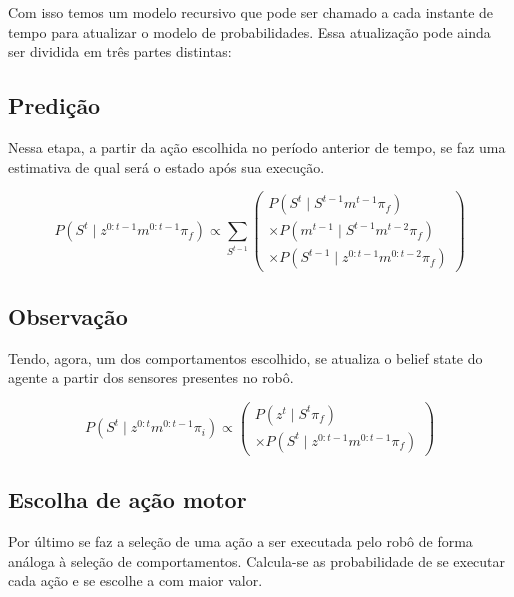 Com isso temos um modelo recursivo que pode ser chamado a cada instante de tempo para atualizar o modelo de probabilidades. Essa atualização pode ainda ser dividida em três partes distintas:

\subsection{Predição}

Nessa etapa, a partir da ação escolhida no período anterior de tempo, se faz uma estimativa de qual será o estado após sua execução.

\begin{equation}
    P \left( S^t \mid z^{0: t-1} m^{0: t-1} \pi_f \right) \propto \sum\limits_{S^{t-1}}
        \left(
            \begin{array}{l}
                P \left( S^t \mid S^{t-1} m^{t-1} \pi_f \right) \\
                \times P \left( m^{t-1} \mid S^{t-1} m^{t-2} \pi_f \right)\\
                \times P \left( S^{t-1} \mid z^{0: t-1} m^{0: t-2} \pi_f \right)
            \end{array}
        \right)
\end{equation}


\subsection{Observação}

Tendo, agora, um dos comportamentos escolhido, se atualiza o belief state do agente a partir dos sensores presentes no robô.

\begin{equation}
    P \left( S^t \mid z^{0: t} m^{0: t-1} \pi_i \right) \propto 
        \left(
            \begin{array}{l}
                P \left( z^t \mid S^t \pi_f \right) \\
                \times P \left( S^t \mid z^{0: t-1} m^{0: t-1} \pi_f \right)
            \end{array}
        \right)
\end{equation}


\subsection{Escolha de ação motor}

Por último se faz a seleção de uma ação a ser executada pelo robô de forma análoga à seleção de comportamentos. Calcula-se as probabilidade de se executar cada ação  e se escolhe a com maior valor.

